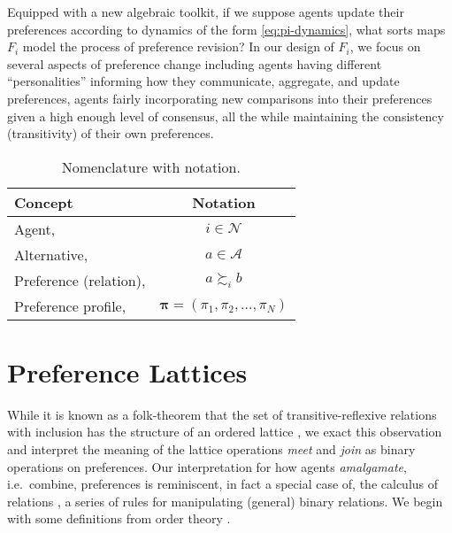 \documentclass[conference]{ieeeconf}
\newcommand{\R}{\mathbb{R}}
\newcommand{\N}{\mathcal{N}}
\newcommand{\A}{\mathcal{A}}
\newcommand{\Pref}{\mathrm{Pref}}
\newcommand{\prefers}{\succsim}
\newcommand{\profile}{\boldsymbol{\pi}}
\newcommand{\metaprefers}{\sqsupseteq}
\begin{document}
Equipped with a new algebraic toolkit, if we suppose agents update their preferences according to dynamics of the form \eqref{eq:pi-dynamics}, what sorts maps $F_i$ model the process of preference revision? In our design of $F_i$, we focus on several aspects of preference change including agents having different ``personalities'' informing how they communicate, aggregate, and update preferences, agents fairly incorporating new comparisons into their preferences given a high enough level of consensus, all the while maintaining the consistency (transitivity) of their own preferences.



\begin{table}
\centering
\caption{Nomenclature with notation.}
\label{table:notation}
\begin{tabular}{p{5cm}c}
\toprule
Concept & Notation \\
\midrule
Agent, & $i \in \N$ \\
Alternative, & $a \in \A$ \\
Preference (relation), & $a \prefers_i b$ \\
Preference profile, & $\profile = \left(\pi_1,\pi_2,\dots,\pi_N\right)$ \\
\bottomrule
\end{tabular}
\end{table}

\section{Preference Lattices}
\label{sec:algebraic}

While it is known as a folk-theorem that the set of transitive-reflexive relations with inclusion has the structure of an ordered lattice \cite{birkhoff1940}, we exact this observation and interpret the meaning of the lattice operations \emph{meet} and \emph{join} as binary operations on preferences. Our interpretation for how agents \emph{amalgamate}, i.e.~combine, preferences is reminiscent, in fact a special case of, the calculus of relations \cite{tarski1941}, a series of rules for manipulating (general) binary relations. We begin with some definitions from order theory \cite{roman}.
\end{document}
